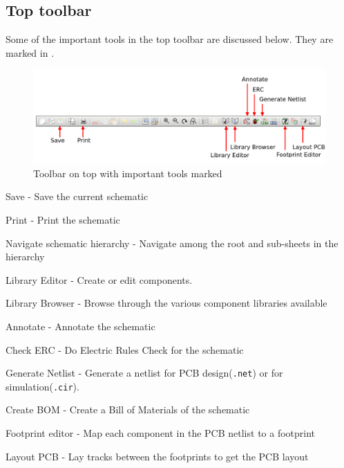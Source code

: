 \subsection{Top toolbar}
Some of the important tools in the top toolbar are discussed
below. They are marked in .
\begin{figure}[h]
\centering
\includegraphics[width=\textwidth]{manual_images/toptoolbar.png}
\caption{Toolbar on top with important tools marked}
\label{eeschem2}
\end{figure}
\begin{compactenum}
\item Save - Save the current schematic
\item Print - Print the schematic
\item Navigate schematic hierarchy - Navigate among the root and
  sub-sheets in the hierarchy
\item Library Editor - Create or edit components.
\item Library Browser - Browse through the various component libraries
  available
\item Annotate - Annotate the schematic
\item Check ERC - Do Electric Rules Check for the schematic
\item Generate Netlist - Generate a netlist for PCB design({\tt .net}) or for
  simulation({\tt .cir}).
\item Create BOM - Create a Bill of Materials of the schematic
\item Footprint editor - Map each component in the PCB netlist to a footprint
\item Layout PCB - Lay tracks between the footprints to get the PCB layout
\end{compactenum}

